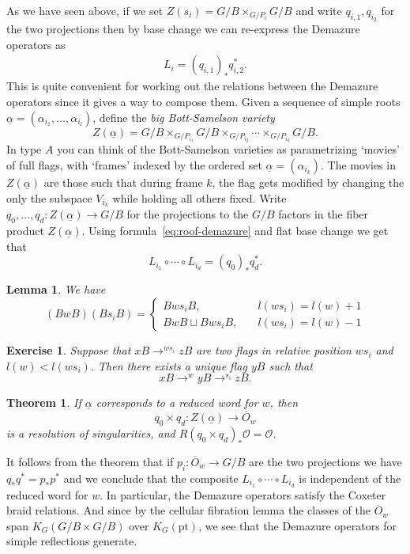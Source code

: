 \documentclass[11pt]{amsart}
\newtheorem{lemma}[dummy]{Lemma}
\newtheorem{exercise}[dummy]{Exercise}
\newtheorem{theorem}[dummy]{Theorem}
\theoremstyle{definition}
\newcommand{\Oc}{\mathcal{O}}
\numberwithin{equation}{subsection}
\numberwithin{figure}{subsection}
\newcommand{\pt}{\mathrm{pt}}
\begin{document}
As we have seen above, if we set $Z(s_i)=G/B\times_{G/P_i} G/B$ and write $q_{i,1},q_{i_2}$ for the two projections then by base change 
we can re-express the Demazure operators as
\begin{align}
\label{eq:roof-demazure}
L_i = (q_{i,1})_*q_{i,2}^*.
\end{align}
This is quite convenient for working out the relations between the Demazure operators since it gives a way to compose them.  Given a sequence of simple roots $\underline{\alpha}=(\alpha_{i_1},\ldots, \alpha_{i_l})$, define the \emph{big Bott-Samelson variety}
$$
Z(\underline{\alpha})= G/B\times_{G/P_{i_1}}G/B\times_{G/P_{i_2}}\cdots\times_{G/P_{i_d}}G/B.
$$
In type $A$ you can think of the Bott-Samelson varieties as parametrizing `movies' of full flags, with `frames' indexed by the ordered set $\underline\alpha=(\alpha_{i_k})$. The movies in $Z(\underline\alpha)$ are those such that during frame $k$, the flag gets modified by changing the only the subspace $V_{i_k}$ while holding all others fixed. 
Write $q_0,\ldots, q_d:Z(\underline\alpha)\rightarrow G/B$ for the projections to the  $G/B$ factors in the fiber product $Z(\underline\alpha)$. Using formula~\eqref{eq:roof-demazure} and flat base change we get that
$$
L_{i_1}\circ\cdots\circ L_{i_d} = (q_0)_*q_d^*.
$$



\begin{lemma}
We have 
$$
(BwB)(Bs_iB)= \begin{cases}
Bws_iB, \quad &l(ws_i)=l(w)+1\\
BwB\sqcup Bws_iB, \quad &l(ws_i)=l(w)-1
\end{cases}
$$
\end{lemma}
\begin{exercise}
Suppose that $xB\rightarrow^{ws_i}zB$ are two flags in relative position $ws_i$ and $l(w)<l(ws_i)$. Then there exists a unique flag $yB$ such that
$$
xB\rightarrow^w yB\rightarrow^{s_i} zB.
$$
\end{exercise}

\begin{theorem}
If $\underline \alpha$ corresponds to a reduced word for $w$, then 
$$
q_0\times q_d :Z(\underline\alpha)\rightarrow \overline{O}_w 
$$
is a resolution of singularities, and $R(q_0\times q_d)_*\Oc=\Oc$.
\end{theorem}
It follows from the theorem that if $p_i:\overline{O}_w \rightarrow G/B$ are the two projections we have $q_*q^*=p_*p^*$ and we conclude that the composite $L_{i_1}\circ\cdots\circ L_{i_d}$ is independent of the reduced word for $w$. In particular, the Demazure operators satisfy the Coxeter braid relations. And since by the cellular fibration lemma the classes of the $\overline{O}_w$ span $K_G(G/B\times G/B)$ over $K_G(\pt)$, we see that the Demazure operators for simple reflections generate.
\end{document}
